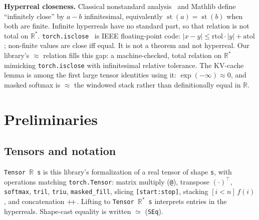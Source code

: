 \documentclass[11pt,a4paper]{article}
\newcommand{\concat}{\mathbin{+\mkern-4mu+}}
\newcommand{\XEq}{\approx}
\newcommand{\SEq}{\simeq}
\newcommand{\Rstar}{\mathbb{R}^*}
\begin{document}
\textbf{Hyperreal closeness.}
Classical nonstandard analysis~\cite{keisler1976elementary} and Mathlib define ``infinitely close'' by $a-b$ infinitesimal, equivalently $\operatorname{st}(a)=\operatorname{st}(b)$ when both are finite.
Infinite hyperreals have no standard part, so that relation is not total on $\Rstar$.
\texttt{torch.isclose}~\cite{pytorch_isclose} is IEEE floating-point code: $|x-y|\le \mathrm{rtol}\cdot|y|+\mathrm{atol}$; non-finite values are close iff equal.
It is not a theorem and not hyperreal.
Our library's $\XEq$ relation fills this gap: a machine-checked, total relation on $\Rstar$ mimicking \texttt{torch.isclose} with infinitesimal relative tolerance.
The KV-cache lemma is among the first large tensor identities using it: $\exp(-\infty)\XEq 0$, and masked softmax is $\XEq$ the windowed stack rather than definitionally equal in $\mathbb{R}$.

\section{Preliminaries}
\label{sec:prelim}

\subsection{Tensors and notation}

\texttt{Tensor $\mathbb{R}$ s} is this library's formalization of a real tensor of shape \texttt{s}, with operations matching \texttt{torch.Tensor}: matrix multiply (\texttt{@}), transpose $(\cdot)^{\top}$, \texttt{softmax}, \texttt{tril}, \texttt{triu}, \texttt{masked\_fill}, slicing \texttt{[start:stop]}, stacking $[i<n]\,f(i)$, and concatenation $\concat$.
Lifting to \texttt{Tensor $\Rstar$ s} interprets entries in the hyperreals.
Shape-cast equality is written $\SEq$ (\texttt{SEq}).
\end{document}
